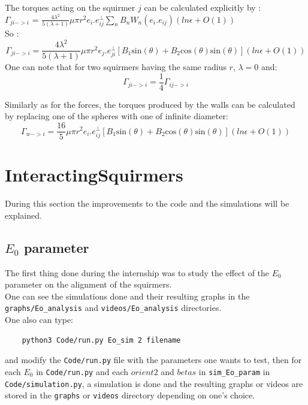\documentclass{article}
\begin{document}
The torques acting on the squirmer $j$ can be calculated explicitly by : \\
$\Gamma_{ji->i}$ = $\frac{4 \lambda^2}{5(\lambda +1)} \mu \pi r^2 e_i.e^{\perp}_{ij}\sum_{n} B_n W_n(e_i.e_{ij}) (ln \epsilon + O(1))$ \cite{Brumley}
\\ So :
\begin{equation*}
    \boxed{\Gamma_{ji->i} = \frac{4 \lambda^2}{5(\lambda +1)} \mu \pi r^2 e_j.e^{\perp}_{ji}\left[B_1\mathrm{sin}(\theta) +B_2\mathrm{cos}(\theta)\mathrm{sin}(\theta) \right] (ln \epsilon + O(1))}
\end{equation*}
One can note that for two squirmers having the same radius $r$, $\lambda = 0$ and:
$$\Gamma_{ji->i} = \frac{1}{4}\Gamma_{ij->i}$$

Similarly as for the forces, the torques produced by the walls can be calculated by replacing one of the spheres with one of infinite diameter:
\begin{equation*}
    \boxed{\Gamma_{w->i} = \frac{16}{5} \mu \pi r^2 e_i.e^{\perp}_{ij}\left[B_1\mathrm{sin}(\theta) +B_2\mathrm{cos}(\theta)\mathrm{sin}(\theta) \right] (ln \epsilon + O(1))}
\end{equation*}

\section{InteractingSquirmers}
During this section the improvements to the code and the simulations will be explained.\\

\subsection{$E_0$ parameter}
The first thing done during the internship was to study the effect of the $E_0$ parameter on the alignment of the squirmers.\\
One can see the simulations done and their resulting graphs in the \texttt{graphs/Eo\_analysis} and \texttt{videos/Eo\_analysis} directories.\\
One also can type:
\begin{verbatim}
    python3 Code/run.py Eo_sim 2 filename
\end{verbatim}
and modify the \texttt{Code/run.py} file with the parameters one wants to test,
 then for each $E_0$ in \texttt{Code/run.py} and each $orient2$ and $betas$ in \texttt{sim\_Eo\_param} in \texttt{Code/simulation.py}, 
 a simulation is done and the resulting graphs or videos are stored in the \texttt{graphs} or \texttt{videos} 
 directory depending on one's choice.\\
\end{document}
